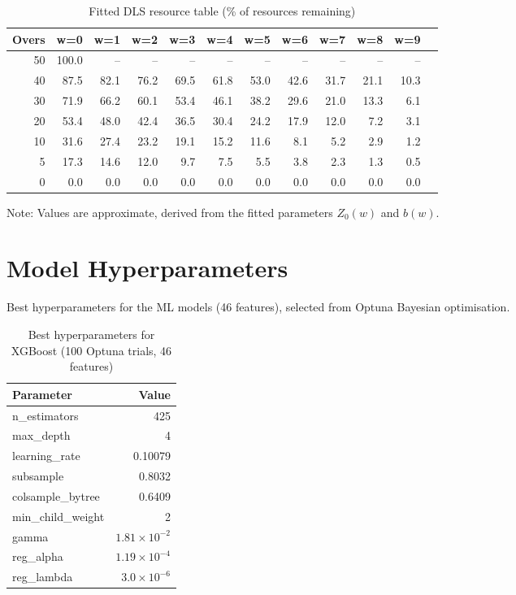 \documentclass[12pt,a4paper,oneside]{report}
\begin{document}
\begin{table}[htbp]
\centering
\caption{Fitted DLS resource table (\% of resources remaining)}
\label{tab:resource_full}
\tiny
\begin{tabular}{rrrrrrrrrrrr}
\toprule
\textbf{Overs} & \textbf{w=0} & \textbf{w=1} & \textbf{w=2} & \textbf{w=3} & \textbf{w=4} & \textbf{w=5} & \textbf{w=6} & \textbf{w=7} & \textbf{w=8} & \textbf{w=9} \\
\midrule
50 & 100.0 & -- & -- & -- & -- & -- & -- & -- & -- & -- \\
40 & 87.5 & 82.1 & 76.2 & 69.5 & 61.8 & 53.0 & 42.6 & 31.7 & 21.1 & 10.3 \\
30 & 71.9 & 66.2 & 60.1 & 53.4 & 46.1 & 38.2 & 29.6 & 21.0 & 13.3 & 6.1 \\
20 & 53.4 & 48.0 & 42.4 & 36.5 & 30.4 & 24.2 & 17.9 & 12.0 & 7.2 & 3.1 \\
10 & 31.6 & 27.4 & 23.2 & 19.1 & 15.2 & 11.6 & 8.1 & 5.2 & 2.9 & 1.2 \\
5  & 17.3 & 14.6 & 12.0 & 9.7 & 7.5 & 5.5 & 3.8 & 2.3 & 1.3 & 0.5 \\
0  & 0.0 & 0.0 & 0.0 & 0.0 & 0.0 & 0.0 & 0.0 & 0.0 & 0.0 & 0.0 \\
\bottomrule
\end{tabular}
\end{table}

Note: Values are approximate, derived from the fitted parameters $Z_0(w)$ and $b(w)$.

\chapter{Model Hyperparameters}
\label{app:hyperparams_v2}

Best hyperparameters for the ML models (46 features), selected from Optuna Bayesian optimisation.

\begin{table}[htbp]
\centering
\caption{Best hyperparameters for XGBoost (100 Optuna trials, 46 features)}
\label{tab:xgb_v2_params}
\begin{tabular}{lr}
\toprule
\textbf{Parameter} & \textbf{Value} \\
\midrule
n\_estimators       & 425 \\
max\_depth          & 4 \\
learning\_rate      & 0.10079 \\
subsample           & 0.8032 \\
colsample\_bytree   & 0.6409 \\
min\_child\_weight  & 2 \\
gamma               & $1.81 \times 10^{-2}$ \\
reg\_alpha          & $1.19 \times 10^{-4}$ \\
reg\_lambda         & $3.0 \times 10^{-6}$ \\
\bottomrule
\end{tabular}
\end{table}
\end{document}
